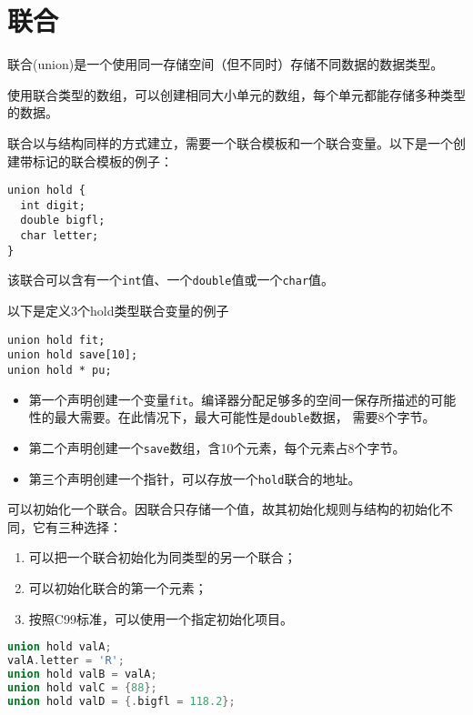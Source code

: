\section{联合}

\begin{frame}[fragile]\ft{\secname}
  联合(union)是一个使用同一存储空间（但不同时）存储不同数据的数据类型。\vspace{0.1in}


  使用联合类型的数组，可以创建相同大小单元的数组，每个单元都能存储多种类型的数据。
\end{frame}


\begin{frame}[fragile]\ft{\secname}
联合以与结构同样的方式建立，需要一个联合模板和一个联合变量。以下是一个创建带标记的联合模板的例子：
\begin{lstlisting}[basicstyle=\ttfamily]
union hold {
  int digit;
  double bigfl;
  char letter;
}  
\end{lstlisting}
该联合可以含有一个\verb|int|值、一个\verb|double|值或一个\verb|char|值。
\end{frame}

\begin{frame}[fragile]\ft{\secname}
以下是定义3个hold类型联合变量的例子
\begin{lstlisting}[basicstyle=\ttfamily]
union hold fit;
union hold save[10];
union hold * pu;
\end{lstlisting}

\begin{itemize}
\item 第一个声明创建一个变量\verb|fit|。编译器分配足够多的空间一保存所描述的可能性的最大需要。在此情况下，最大可能性是\verb|double|数据，
  需要8个字节。\\[0.1in]
\item 第二个声明创建一个\verb|save|数组，含10个元素，每个元素占8个字节。\\[0.1in]
\item 第三个声明创建一个指针，可以存放一个\verb|hold|联合的地址。
\end{itemize}
\end{frame}

\begin{frame}[fragile]\ft{\secname}
可以初始化一个联合。因联合只存储一个值，故其初始化规则与结构的初始化不同，它有三种选择：\vspace{0.05in}

\begin{enumerate}
\item 可以把一个联合初始化为同类型的另一个联合；\\[0.1in]
\item 可以初始化联合的第一个元素；\\[0.1in]
\item 按照C99标准，可以使用一个指定初始化项目。
\end{enumerate}

\begin{lstlisting}[language=c,backgroundcolor=\color{red!20}]
union hold valA;
valA.letter = 'R';
union hold valB = valA;
union hold valC = {88};
union hold valD = {.bigfl = 118.2};
\end{lstlisting}
\end{frame}

